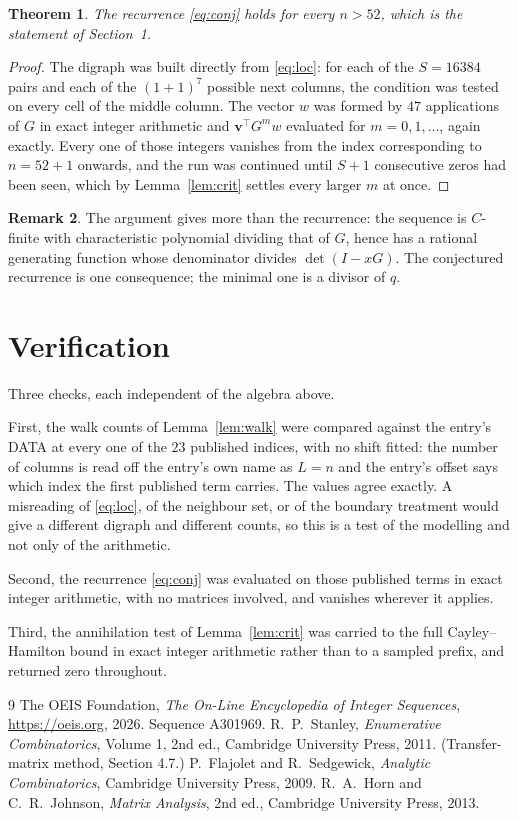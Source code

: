 \documentclass[11pt,a4paper]{article}
\theoremstyle{plain}
\newtheorem{theorem}{Theorem}
\theoremstyle{definition}
\newtheorem{remark}[theorem]{Remark}
\begin{document}
\begin{theorem}
The recurrence \eqref{eq:conj} holds for every $n>52$, which is the statement of
Section~1.
\end{theorem}

\begin{proof}
The digraph was built directly from \eqref{eq:loc}: for each of the $S=16384$ pairs and each
of the $(1+1)^{7}$ possible next columns, the condition was tested on every cell of
the middle column. The vector $w$ was formed by $47$ applications of $G$ in exact integer
arithmetic and $\mathbf{v}^{\!\top}G^{m}w$ evaluated for $m=0,1,\dots$, again exactly.
Every one of those integers vanishes from the index corresponding to $n=52+1$ onwards,
and the run was continued until $S+1$ consecutive zeros had been seen, which by
Lemma~\ref{lem:crit} settles every larger $m$ at once.
\end{proof}

\begin{remark}
The argument gives more than the recurrence: the sequence is $C$-finite with characteristic
polynomial dividing that of $G$, hence has a rational generating function whose denominator
divides $\det(I-xG)$. The conjectured recurrence is one consequence; the minimal one is a
divisor of $q$.
\end{remark}

\section{Verification}

Three checks, each independent of the algebra above.

First, the walk counts of Lemma~\ref{lem:walk} were compared against the entry's DATA at
every one of the $23$ published indices, with no shift fitted: the number of columns is
read off the entry's own name as $L=n$ and the entry's offset says which index the first
published term carries. The values agree exactly. A misreading of \eqref{eq:loc}, of the
neighbour set, or of the boundary treatment would give a different digraph and different
counts, so this is a test of the modelling and not only of the arithmetic.

Second, the recurrence \eqref{eq:conj} was evaluated on those published terms in exact
integer arithmetic, with no matrices involved, and vanishes wherever it applies.

Third, the annihilation test of Lemma~\ref{lem:crit} was carried to the full
Cayley--Hamilton bound in exact integer arithmetic rather than to a sampled prefix, and
returned zero throughout.

\begin{thebibliography}{9}
 The OEIS Foundation, \emph{The On-Line Encyclopedia of Integer
Sequences}, \url{https://oeis.org}, 2026. Sequence A301969.
 R.~P.~Stanley, \emph{Enumerative Combinatorics}, Volume 1, 2nd ed.,
Cambridge University Press, 2011. (Transfer-matrix method, Section 4.7.)
 P.~Flajolet and R.~Sedgewick, \emph{Analytic Combinatorics}, Cambridge
University Press, 2009.
 R.~A.~Horn and C.~R.~Johnson, \emph{Matrix Analysis}, 2nd ed., Cambridge
University Press, 2013.
\end{thebibliography}
\end{document}

